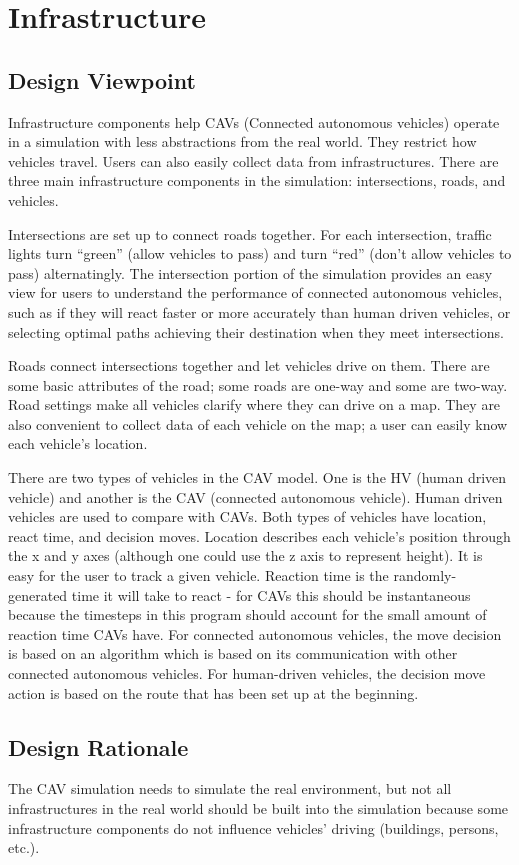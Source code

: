 \documentclass[onecolumn, draftclsnofoot,10pt, compsoc]{IEEEtran}
\begin{document}
\section{Infrastructure}
\subsection{Design Viewpoint}
Infrastructure components help CAVs (Connected autonomous vehicles) operate in a simulation with less abstractions from the real world.
They restrict how vehicles travel.
Users can also easily collect data from infrastructures.
There are three main infrastructure components in the simulation: intersections, roads, and vehicles.

Intersections are set up to connect roads together.
For each intersection, traffic lights turn “green” (allow vehicles to pass) and turn “red” (don’t allow vehicles to pass) alternatingly.
The intersection portion of the simulation provides an easy view for users to understand the performance of connected autonomous vehicles, such as if they will react faster or more accurately than human driven vehicles, or selecting optimal paths achieving their destination when they meet intersections.

Roads connect intersections together and let vehicles drive on them.
There are some basic attributes of the road; some roads are one-way and some are two-way.
Road settings make all vehicles clarify where they can drive on a map.
They are also convenient to collect data of each vehicle on the map; a user can easily know each vehicle’s location.

There are two types of vehicles in the CAV model.
One is the HV (human driven vehicle) and another is the CAV (connected autonomous vehicle).
Human driven vehicles are used to compare with CAVs.
Both types of vehicles have location, react time, and decision moves.
Location describes each vehicle’s position through the x and y axes (although one could use the z axis to represent height).
It is easy for the user to track a given vehicle.
Reaction time is the randomly-generated time it will take to react - for CAVs this should be instantaneous because the timesteps in this program should account for the small amount of reaction time CAVs have.
For connected autonomous vehicles, the move decision is based on an algorithm which is based on its communication with other connected autonomous vehicles.
For human-driven vehicles, the decision move action is based on the route that has been set up at the beginning.
\subsection{Design Rationale}
The CAV simulation needs to simulate the real environment, but not all infrastructures in the real world should be built into the simulation because some infrastructure components do not influence vehicles’ driving (buildings, persons, etc.).
\end{document}
